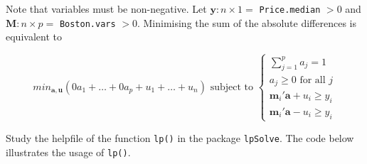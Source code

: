 \documentclass[
]{book}
\begin{document}
Note that variables must be non-negative. Let \(\mathbf{y}:n×1=\) \texttt{Price.median} \(>0\) and
\(\mathbf{M}:n×p=\) \texttt{Boston.vars} \(>0\). Minimising the sum of the absolute differences is equivalent to

\[
min_{\mathbf{a},\mathbf{u}} \left(0a_1 + \dots + 0a_p + u_1 + \dots + u_n \right) \text{ subject to }
\left\{
\begin{array}{ll}
\sum_{j=1}^{p}{a_j} = 1\\
a_j \ge 0 \text{ for all } j\\
\mathbf{m}_i'\mathbf{a} + u_i \ge y_i\\
\mathbf{m}_i'\mathbf{a} - u_i \ge y_i
\end{array}
\right.
\]

Study the helpfile of the function \texttt{lp()} in the package \texttt{lpSolve}. The code below illustrates the usage of \texttt{lp()}.
\end{document}
